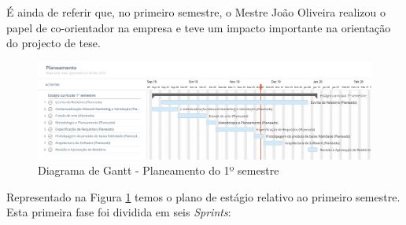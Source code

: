 É ainda de referir que, no primeiro semestre, o Mestre João Oliveira realizou o papel de co-orientador na empresa e teve um impacto importante na orientação do projecto de tese. 

\begin{figure}[ht!]
	\begin{center}
		\includegraphics[width=1\textwidth]{img/gantt/semestre1.jpeg}
		\caption{Diagrama de Gantt - Planeamento do 1º semestre}
		\label{fig:gantt1}
	\end{center}
\end{figure}

Representado na Figura \ref{fig:gantt1} temos o plano de estágio relativo ao primeiro semestre.
Esta primeira fase foi dividida em seis \textit{Sprints}:
  
